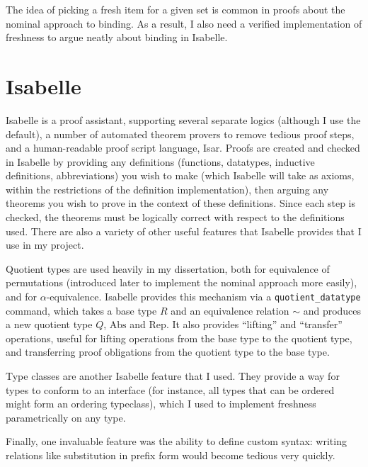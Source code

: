 The idea of picking a fresh item for a given set is common in proofs about the nominal approach to binding.
As a result, I also need a verified implementation of freshness to argue neatly about binding in Isabelle.

\section{Isabelle}
Isabelle\cite{isabelle} is a proof assistant, supporting several separate logics (although I use the default), a number of automated theorem provers to remove tedious proof steps, and a human-readable proof script language, Isar.
Proofs are created and checked in Isabelle by providing any definitions (functions, datatypes, inductive definitions, abbreviations) you wish to make (which Isabelle will take as axioms, within the restrictions of the definition implementation), then arguing any theorems you wish to prove in the context of these definitions.
Since each step is checked, the theorems must be logically correct with respect to the definitions used.
There are also a variety of other useful features that Isabelle provides that I use in my project.

Quotient types are used heavily in my dissertation, both for equivalence of permutations (introduced later to implement the nominal approach more easily), and for \(\alpha\)-equivalence.
Isabelle provides this mechanism via a \texttt{quotient\_datatype} command\cite{isabelle-quotient}, which takes a base type \(R\) and an equivalence relation \(\sim\) and produces a new quotient type \(Q\), \(\mathrm{Abs}\) and \(\mathrm{Rep}\).
It also provides ``lifting'' and ``transfer'' operations, useful for lifting operations from the base type to the quotient type, and transferring proof obligations from the quotient type to the base type.

Type classes are another Isabelle feature that I used.
They provide a way for types to conform to an interface (for instance, all types that can be ordered might form an ordering typeclass), which I used to implement freshness parametrically on any type.

Finally, one invaluable feature was the ability to define custom syntax: writing relations like substitution in prefix form would become tedious very quickly.

